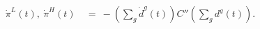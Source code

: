 \begin{equation}
\begin{split}
    \dot{\pi}^{L} (t), \ \dot{\pi}^{H} (t) \
    & = \ -\left( \sum_{g} \dot{d}^{g}(t) \right) C''\left( \sum_{g} d^{g}(t) \right).
\end{split}
\label{Equation:AKS-Style-Model_pi-dots}
\end{equation}
